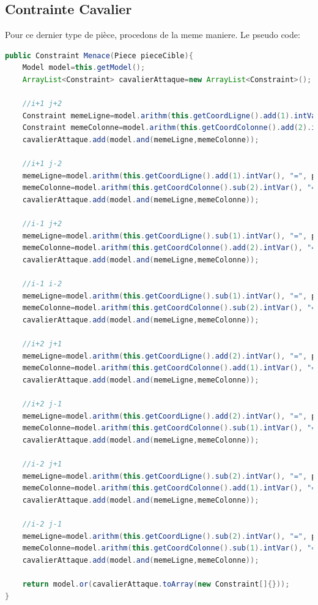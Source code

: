 \documentclass[a4paper,10pt]{article}
\begin{document}
\subsection{Contrainte Cavalier}
Pour ce dernier type de pièce, procedons de la meme maniere. Le pseudo code:
\begin{lstlisting}[language=Java,basicstyle=\tiny]
public Constraint Menace(Piece pieceCible){
	Model model=this.getModel();
	ArrayList<Constraint> cavalierAttaque=new ArrayList<Constraint>();
		
	//i+1 j+2
	Constraint memeLigne=model.arithm(this.getCoordLigne().add(1).intVar(), "=", pieceCible.getCoordLigne());
	Constraint memeColonne=model.arithm(this.getCoordColonne().add(2).intVar(), "=", pieceCible.getCoordColonne());
	cavalierAttaque.add(model.and(memeLigne,memeColonne));
	
	//i+1 j-2
	memeLigne=model.arithm(this.getCoordLigne().add(1).intVar(), "=", pieceCible.getCoordLigne());
	memeColonne=model.arithm(this.getCoordColonne().sub(2).intVar(), "=", pieceCible.getCoordColonne());
	cavalierAttaque.add(model.and(memeLigne,memeColonne));
		
	//i-1 j+2
	memeLigne=model.arithm(this.getCoordLigne().sub(1).intVar(), "=", pieceCible.getCoordLigne());
	memeColonne=model.arithm(this.getCoordColonne().add(2).intVar(), "=", pieceCible.getCoordColonne());
	cavalierAttaque.add(model.and(memeLigne,memeColonne));
	
	//i-1 i-2
	memeLigne=model.arithm(this.getCoordLigne().sub(1).intVar(), "=", pieceCible.getCoordLigne());
	memeColonne=model.arithm(this.getCoordColonne().sub(2).intVar(), "=", pieceCible.getCoordColonne());
	cavalierAttaque.add(model.and(memeLigne,memeColonne));
	
	//i+2 j+1
	memeLigne=model.arithm(this.getCoordLigne().add(2).intVar(), "=", pieceCible.getCoordLigne());
	memeColonne=model.arithm(this.getCoordColonne().add(1).intVar(), "=", pieceCible.getCoordColonne());
	cavalierAttaque.add(model.and(memeLigne,memeColonne));
	
	//i+2 j-1
	memeLigne=model.arithm(this.getCoordLigne().add(2).intVar(), "=", pieceCible.getCoordLigne());
	memeColonne=model.arithm(this.getCoordColonne().sub(1).intVar(), "=", pieceCible.getCoordColonne());
	cavalierAttaque.add(model.and(memeLigne,memeColonne));
	
	//i-2 j+1
	memeLigne=model.arithm(this.getCoordLigne().sub(2).intVar(), "=", pieceCible.getCoordLigne());
	memeColonne=model.arithm(this.getCoordColonne().add(1).intVar(), "=", pieceCible.getCoordColonne());
	cavalierAttaque.add(model.and(memeLigne,memeColonne));
	
	//i-2 j-1
	memeLigne=model.arithm(this.getCoordLigne().sub(2).intVar(), "=", pieceCible.getCoordLigne());
	memeColonne=model.arithm(this.getCoordColonne().sub(1).intVar(), "=", pieceCible.getCoordColonne());
	cavalierAttaque.add(model.and(memeLigne,memeColonne));
	
	return model.or(cavalierAttaque.toArray(new Constraint[]{}));
}
\end{lstlisting}
\end{document}
